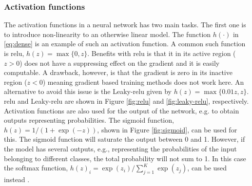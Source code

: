 
\subsubsection{Activation functions}
The activation functions in a neural network has two main tasks. The first one is to introduce non-linearity to an otherwise linear model. The function $h(\cdot)$ in \eqref{eq:dense} is an example of such an activation function. A common such function is \gls{relu}, $h(z) = \max\{0,z\}$. Benefits with \gls{relu} is that it in its active region ($z>0$) does not have a suppressing effect on the gradient and it is easily computable. A drawback, however, is that the gradient is zero in its inactive region ($z < 0$) meaning gradient based training methods does not work here. An alternative to avoid this issue is the Leaky-\gls{relu} given by $h(z) = \max\{0.01 z, z\}$.
\gls{relu} and Leaky-\gls{relu} are shown in Figure \ref{fig:relu} and \ref{fig:leaky-relu}, respectively. Activation functions are also used for the output of the network, e.g. to obtain outputs representing probabilities. The sigmoid function, $h(z) = 1/(1+\exp(-z))$, shown in Figure \ref{fig:sigmoid}, can be used for this.
The sigmoid function will saturate the output between 0 and 1. However, if the model has several outputs, e.g., representing the probabilities of the input belonging to different classes, the total probability will not sum to 1. In this case the softmax function, $h(z)_i = \exp(z_i)/\sum_{j=1}^K \exp(z_j)$, can be used instead \cite{Goodfellow2016}. %

